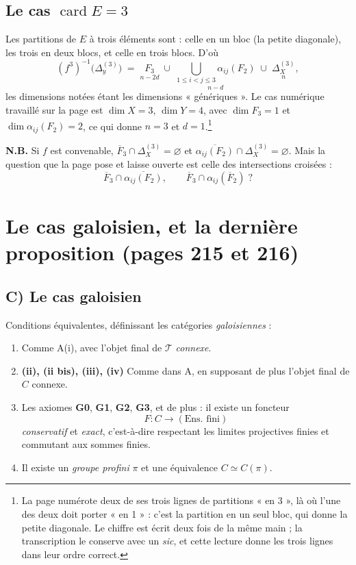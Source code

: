 \documentclass[11pt,a4paper]{article}
\begin{document}
\subsection*{Le cas $\operatorname{card} E = 3$}

Les partitions de $E$ à trois éléments sont : celle en un bloc (la petite
diagonale), les trois en deux blocs, et celle en trois blocs. D'où
\[
  (f^{3})^{-1}\bigl(\Delta_{y}^{(3)}\bigr) \;=\;
  \underset{n - 2d}{F_{3}} \;\cup\;
  \underset{n - d}{\bigcup_{1 \leqslant i < j \leqslant 3} \alpha_{ij}(F_{2})}
  \;\cup\; \underset{n}{\Delta_{X}^{(3)}} ,
\]
les dimensions notées étant les dimensions « génériques ». Le cas numérique
travaillé sur la page est $\dim X = 3$, $\dim Y = 4$, avec
$\dim F_{3} = 1$ et $\dim \alpha_{ij}(F_{2}) = 2$, ce qui donne $n = 3$ et
$d = 1$.\footnote{La page numérote deux de ses trois lignes de partitions
« en 3 », là où l'une des deux doit porter « en 1 » : c'est la partition en un
seul bloc, qui donne la petite diagonale. Le chiffre est écrit deux fois de la
même main ; la transcription le conserve avec un \emph{sic}, et cette lecture
donne les trois lignes dans leur ordre correct.}

\textbf{N.B.} Si $f$ est convenable, $\overline{F}_{3} \cap
\Delta_{X}^{(3)} = \varnothing$ et
$\overline{\alpha_{ij}(F_{2})} \cap \Delta_{X}^{(3)} = \varnothing$. Mais la
question que la page pose et laisse ouverte est celle des intersections
croisées :
\[
  \overline{F}_{3} \cap \overline{\alpha_{ij}(F_{2})} ,
  \qquad
  \overline{F}_{3} \cap \alpha_{ij}(\overline{F}_{2}) \;?
\]

\section*{Le cas galoisien, et la dernière proposition (pages 215 et 216)}

\subsection*{C) Le cas galoisien}

Conditions équivalentes, définissant les catégories \emph{galoisiennes} :

\begin{enumerate}
  \item[(i)] Comme A(i), avec l'objet final de $\mathcal{T}$ \emph{connexe}.
  \item[] \textbf{(ii), (ii bis), (iii), (iv)} Comme dans A, en supposant de
    plus l'objet final de $C$ connexe.
  \item[(v)] Les axiomes \textbf{G0}, \textbf{G1}, \textbf{G2}, \textbf{G3},
    et de plus : il existe un foncteur
    \[
      F : C \longrightarrow (\text{Ens.\ fini})
    \]
    \emph{conservatif} et \emph{exact}, c'est-à-dire respectant les limites
    projectives finies et commutant aux sommes finies.
  \item[(vi)] Il existe un \emph{groupe profini} $\pi$ et une équivalence
    $C \simeq C(\pi)$.
\end{enumerate}
\end{document}
